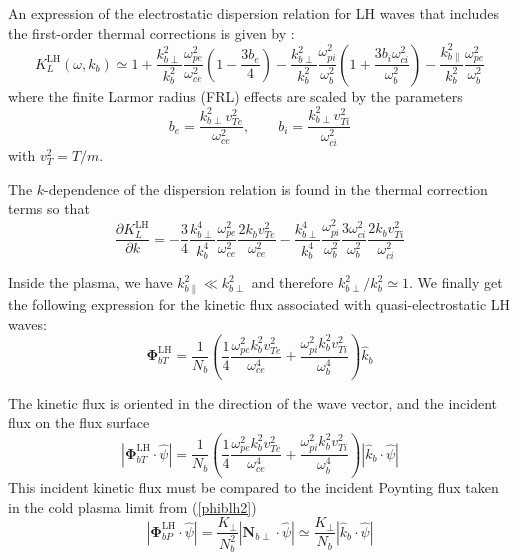 An expression of the electrostatic dispersion relation for LH
waves that includes the first-order thermal corrections is given
by \cite{por02n1}:
\begin{equation}
K_{L}^{\text{LH}}(\omega,k_{b})\simeq1+\frac{k_{b\perp}^{2}}{k_{b}^{2}}%
\frac{\omega_{pe}^{2}}{\omega_{ce}^{2}}\left(  1-\frac{3b_{e}}{4}\right)
-\frac{k_{b\perp}^{2}}{k_{b}^{2}}\frac{\omega_{pi}^{2}}{\omega_{b}^{2}}\left(
1+\frac{3b_{i}\omega_{ci}^{2}}{\omega_{b}^{2}}\right)  -\frac{k_{b\parallel
}^{2}}{k_{b}^{2}}\frac{\omega_{pe}^{2}}{\omega_{b}^{2}} \label{dispreleslhkin}%
\end{equation}
where the finite Larmor radius (FRL) effects are scaled by the parameters
\begin{equation}
b_{e}=\frac{k_{b\perp}^{2}v_{Te}^{2}}{\omega_{ce}^{2}},\qquad b_{i}%
=\frac{k_{b\perp}^{2}v_{Ti}^{2}}{\omega_{ci}^{2}} \label{flr}%
\end{equation}
with $v_{T}^{2}=T/m$.

The $k$-dependence of the dispersion relation is found in the thermal
correction terms so that
\begin{equation}
\frac{\partial K_{L}^{\text{LH}}}{\partial k}=-\frac{3}{4}\frac{k_{b\perp}%
^{4}}{k_{b}^{4}}\frac{\omega_{pe}^{2}}{\omega_{ce}^{2}}\frac{2k_{b}v_{Te}^{2}%
}{\omega_{ce}^{2}}-\frac{k_{b\perp}^{4}}{k_{b}^{4}}\frac{\omega_{pi}^{2}%
}{\omega_{b}^{2}}\frac{3\omega_{ci}^{2}}{\omega_{b}^{2}}\frac{2k_{b}v_{Ti}%
^{2}}{\omega_{ci}^{2}} \label{kdepdispreleslhkin}%
\end{equation}

Inside the plasma, we have $k_{b\parallel}^{2}\ll k_{b\perp}^{2}$ and
therefore $k_{b\perp}^{2}/k_{b}^{2}\simeq1$. We finally get the following
expression for the kinetic flux associated with quasi-electrostatic LH waves:
\begin{equation}
\mathbf{\Phi}_{bT}^{\text{LH}}=\frac{1}{N_{b}}\left(  \frac{1}{4}\frac
{\omega_{pe}^{2}k_{b}^{2}v_{Te}^{2}}{\omega_{ce}^{4}}+\frac{\omega_{pi}%
^{2}k_{b}^{2}v_{Ti}^{2}}{\omega_{b}^{4}}\right)  \widehat{k}_{b}
\label{kinfluxeslh}%
\end{equation}

The kinetic flux is oriented in the direction of the wave vector, and the
incident flux on the flux surface
\begin{equation}
\left|  \mathbf{\Phi}_{bT}^{\text{LH}}\cdot\widehat{\psi}\right|  =\frac
{1}{N_{b}}\left(  \frac{1}{4}\frac{\omega_{pe}^{2}k_{b}^{2}v_{Te}^{2}}%
{\omega_{ce}^{4}}+\frac{\omega_{pi}^{2}k_{b}^{2}v_{Ti}^{2}}{\omega_{b}^{4}%
}\right)  \left|  \widehat{k}_{b}\cdot\widehat{\psi}\right|
\label{kinfluxeslhperp}%
\end{equation}
This incident kinetic flux must be compared to the incident Poynting flux
taken in the cold plasma limit from (\ref{phiblh2})
\begin{equation}
\left|  \mathbf{\Phi}_{bP}^{\text{LH}}\cdot\widehat{\psi}\right|
=\frac{K_{\perp}}{N_{b}^{2}}\left|  \mathbf{N}_{b\perp}\cdot\widehat{\psi
}\right|  \simeq\frac{K_{\perp}}{N_{b}}\left|  \widehat{k}_{b}\cdot
\widehat{\psi}\right|  \label{poyntfluxeslhperp}%
\end{equation}

